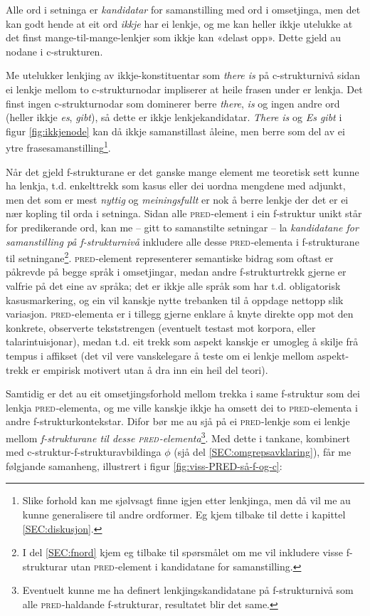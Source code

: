 \documentclass[12pt,a4paper,oneside,draft]{report}
\newcommand{\F}[2]{\textsc{#1}\ensuremath{_{#2}}}
\newcommand{\PRED}{\F{pred}{}}
\begin{document}
Alle ord i setninga er \emph{kandidatar} for samanstilling med ord i
omsetjinga, men det kan godt hende at eit ord \emph{ikkje} har ei lenkje,
og me kan heller ikkje utelukke at det finst mange-til-mange-lenkjer
som ikkje kan «delast opp». Dette gjeld au nodane i c-strukturen.

Me utelukker lenkjing av ikkje-konstituentar som \emph{there is} på
c-strukturnivå sidan ei lenkje mellom to c-strukturnodar impliserer at
heile frasen under er lenkja. Det finst ingen c-strukturnodar som
dominerer berre \emph{there}, \emph{is} og ingen andre ord (heller ikkje \emph{es},
\emph{gibt}), så dette er ikkje lenkjekandidatar.  \emph{There is} og \emph{Es gibt}
i figur \ref{fig:ikkjenode} kan då ikkje samanstillast åleine, men
berre som del av ei ytre frasesamanstilling\footnote{Slike forhold kan me sjølvsagt finne igjen etter lenkjinga,
        men då vil me au kunne generalisere til andre ordformer. Eg
        kjem tilbake til dette i kapittel \ref{SEC:diskusjon}. }.

Når det gjeld f-strukturane er det ganske mange element me teoretisk
sett kunne ha lenkja, t.d. enkelttrekk som kasus eller dei uordna
mengdene med adjunkt, men det som er mest \emph{nyttig} og \emph{meiningsfullt}
er nok å berre lenkje der det er ei nær kopling til orda i
setninga. Sidan alle \PRED{}-element i ein f-struktur unikt står for
predikerande ord, kan me -- gitt to samanstilte setningar -- la
\emph{kandidatane for samanstilling på f-strukturnivå} inkludere alle
desse \PRED{}-elementa i f-strukturane til
setningane\footnote{I del \ref{SEC:fnord} kjem eg tilbake til spørsmålet om me vil
        inkludere visse f-strukturar utan \PRED{}-element i kandidatane
        for samanstilling. }. \PRED{}-element representerer semantiske bidrag som
oftast er påkrevde på begge språk i omsetjingar, medan andre
f-strukturtrekk gjerne er valfrie på det eine av språka; det er ikkje
alle språk som har t.d. obligatorisk kasusmarkering, og ein vil
kanskje nytte trebanken til å oppdage nettopp slik variasjon.
\PRED{}-elementa er i tillegg gjerne enklare å knyte direkte opp mot den
konkrete, observerte tekststrengen (eventuelt testast mot korpora,
eller talarintuisjonar), medan t.d. eit trekk som aspekt kanskje er
umogleg å skilje frå tempus i affikset (det vil vere vanskelegare å
teste om ei lenkje mellom aspekt-trekk er empirisk motivert utan å dra
inn ein heil del teori).

Samtidig er det au eit omsetjingsforhold mellom trekka i same
f-struktur som dei lenkja \PRED{}-elementa, og me ville kanskje ikkje ha
omsett dei to \PRED{}-elementa i andre f-strukturkontekstar. Difor bør me
au sjå på ei \PRED{}-lenkje som ei lenkje mellom \emph{f-strukturane til
desse \PRED{}-elementa}\footnote{Eventuelt kunne me ha definert lenkjingskandidatane på
       f-strukturnivå som alle \PRED{}-haldande f-strukturar, resultatet
       blir det same. }.  Med dette i tankane, kombinert med
c-struktur-f-strukturavbildinga $\phi$ (sjå del
\ref{SEC:omgrepsavklaring}), får me følgjande samanheng, illustrert i
figur \ref{fig:viss-PRED-så-f-og-c}:
\end{document}
